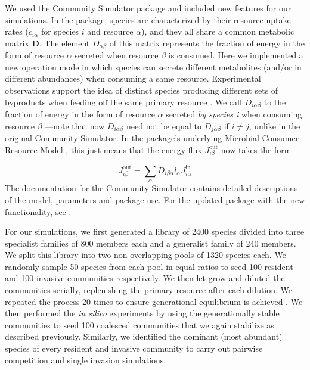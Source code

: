 \documentclass[a4paper,10pt]{article}
\begin{document}
We used the Community Simulator package \cite{Marsland2020} and included new
features for our simulations. In the package,
species are characterized by their resource uptake rates ($c_{i\alpha}$ for
species $i$ and resource $\alpha$), and they all
share a common metabolic matrix $\mathbf{D}$.
The element $D_{\alpha\beta}$
of this matrix represents the fraction of energy in the form of resource $\alpha$
secreted when resource $\beta$ is consumed.
Here we implemented a new operation mode
in which species can secrete different metabolites (and/or
in different abundances) when consuming a same resource. Experimental observations
support the idea of distinct species producing different sets of byproducts when
feeding off the same primary resource
\cite{Harcombe2014,Pinu2018}.
We call $D_{i\alpha\beta}$ to the
fraction of energy in the form of resource $\alpha$ secreted \textit{by species
i} when consuming resource $\beta$ ---note that now $D_{i\alpha\beta}$ need not be
equal to $D_{j\alpha\beta}$ if $i \neq j$, unlike in the original Community
Simulator. In the package's underlying Microbial Consumer Resource Model
\cite{Goldford2018,Marsland2019}, this just means that the energy flux
$J^{\mathrm{out}}_{i\beta}$ now takes the form

\begin{equation}
J^{\mathrm{out}}_{i\beta} = \sum_\alpha D_{i\beta\alpha} l_\alpha J^{\mathrm{in}}_{i\alpha}
\label{eq:jout}
\end{equation}
%
The documentation for the Community Simulator contains detailed
descriptions of the model, parameters and package use. For the updated package with
the new functionality, see .

For our simulations,
we first generated a library of 2400 species divided into three specialist
families of 800 members each
and a generalist family of 240 members.
We split this library into two non-overlapping pools of 1320 species each.
We randomly sample 50 species from each pool in equal ratios to seed
100 resident and
100 invasive communities respectively.
We then let grow and diluted the communities serially,
replenishing the primary
resource after each dilution.
We repeated the process 20 times to ensure generational equilibrium is
achieved \cite{Goldford2018}.
We then performed the \textit{in silico} experiments by using the
generationally stable communities to seed 100 coalesced communities
that we again stabilize as described previously.
Similarly, we identified the dominant (most
abundant) species of every resident and invasive community to carry out pairwise
competition and single invasion simulations.
\end{document}
